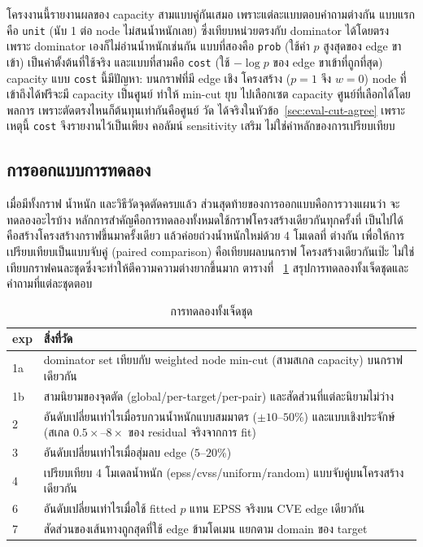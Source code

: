 โครงงานนี้รายงานผลของ capacity สามแบบคู่กันเสมอ เพราะแต่ละแบบตอบคำถามต่างกัน
แบบแรกคือ \texttt{unit} (นับ 1 ต่อ node ไม่สนน้ำหนักเลย) ซึ่งเทียบหน่วยตรงกับ dominator
ได้โดยตรง เพราะ dominator เองก็ไม่อ่านน้ำหนักเช่นกัน แบบที่สองคือ \texttt{prob} (ใช้ค่า
$p$ สูงสุดของ edge ขาเข้า) เป็นค่าตั้งต้นที่ใช้จริง และแบบที่สามคือ \texttt{cost} (ใช้ $-\log p$
ของ edge ขาเข้าที่ถูกที่สุด) capacity แบบ \texttt{cost} นี้มีปัญหา: บนกราฟที่มี edge เชิง
โครงสร้าง ($p=1$ จึง $w=0$) node ที่เข้าถึงได้ฟรีจะมี capacity เป็นศูนย์ ทำให้ min-cut ยุบ
ไปเลือกเซต capacity ศูนย์ที่เลือกได้โดยพลการ เพราะตัดตรงไหนก็ต้นทุนเท่ากันคือศูนย์ วัด
ได้จริงในหัวข้อ~\ref{sec:eval-cut-agree} เพราะเหตุนี้ \texttt{cost} จึงรายงานไว้เป็นเพียง
คอลัมน์ sensitivity เสริม ไม่ใช่ค่าหลักของการเปรียบเทียบ

\subsection{การออกแบบการทดลอง}\label{sec:design-experiments}

เมื่อมีทั้งกราฟ น้ำหนัก และวิธีวัดจุดตัดครบแล้ว ส่วนสุดท้ายของการออกแบบคือการวางแผนว่า
จะทดลองอะไรบ้าง หลักการสำคัญคือการทดลองทั้งหมดใช้กราฟโครงสร้างเดียวกันทุกครั้งที่
เป็นไปได้ คือสร้างโครงสร้างกราฟขึ้นมาครั้งเดียว แล้วค่อยถ่วงน้ำหนักใหม่ด้วย 4 โมเดลที่
ต่างกัน เพื่อให้การเปรียบเทียบเป็นแบบจับคู่ (paired comparison) คือเทียบผลบนกราฟ
โครงสร้างเดียวกันเป๊ะ ไม่ใช่เทียบกราฟคนละชุดซึ่งจะทำให้ตีความความต่างยากขึ้นมาก ตารางที่
~\ref{tab:exps} สรุปการทดลองทั้งเจ็ดชุดและคำถามที่แต่ละชุดตอบ

\begin{table}[H]
\centering
\caption{การทดลองทั้งเจ็ดชุด}\label{tab:exps}
\small
\begin{tabular}{lp{10cm}}
\toprule
exp & สิ่งที่วัด \\
\midrule
1a & dominator set เทียบกับ weighted node min-cut (สามสเกล capacity) บนกราฟเดียวกัน \\
1b & สามนิยามของจุดตัด (global/per-target/per-pair) และสัดส่วนที่แต่ละนิยามไม่ว่าง \\
2 & อันดับเปลี่ยนเท่าไรเมื่อรบกวนน้ำหนักแบบสมมาตร ($\pm10$--$50\%$) และแบบเชิงประจักษ์
(สเกล $0.5\times$--$8\times$ ของ residual จริงจากการ fit) \\
3 & อันดับเปลี่ยนเท่าไรเมื่อสุ่มลบ edge ($5$--$20\%$) \\
4 & เปรียบเทียบ 4 โมเดลน้ำหนัก (epss/cvss/uniform/random) แบบจับคู่บนโครงสร้างเดียวกัน \\
6 & อันดับเปลี่ยนเท่าไรเมื่อใช้ fitted $p$ แทน EPSS จริงบน CVE edge เดียวกัน \\
7 & สัดส่วนของเส้นทางถูกสุดที่ใช้ edge ข้ามโดเมน แยกตาม domain ของ target \\
\bottomrule
\end{tabular}
\end{table}

